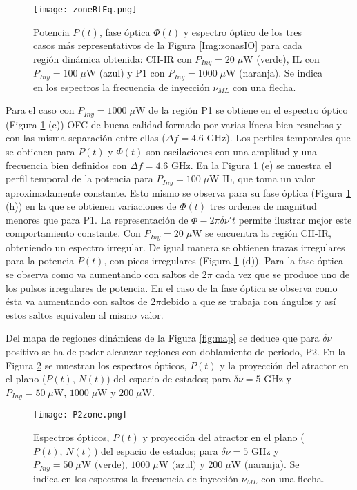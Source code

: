 			\begin{figure}[H]
				\centering
				\texttt{[image: zoneRtEq.png]}
				\caption{\label{fig:zoneRtEq}Potencia $P(t)$, fase óptica $\Phi (t)$ y espectro óptico de los tres casos más representativos de la Figura \ref{Img:zonasIO} para cada región dinámica obtenida: CH-IR con $P_{Iny} = 20\;\mu$W (verde), IL con $P_{Iny} = 100\;\mu$W (azul) y P1 con $P_{Iny} = 1000\;\mu$W (naranja). Se indica en los espectros la frecuencia de inyección $\nu_{ML}$ con una flecha.}	
			\end{figure}

		Para el caso con $P_{Iny} = 1000\;\mu$W de la región P1 se obtiene en el espectro óptico (Figura \ref{fig:zoneRtEq} (c)) OFC de buena calidad formado por varias líneas bien resueltas y con las misma separación entre ellas ($\Delta f = 4.6$ GHz). Los perfiles temporales que se obtienen para $P(t)$ y $\Phi(t)$ son oscilaciones con una amplitud y una frecuencia bien definidos con $\Delta f = 4.6$ GHz. En la Figura \ref{fig:zoneRtEq} (e)  se muestra el perfil temporal de la potencia para $P_{Iny} = 100\;\mu$W IL, que toma un valor aproximadamente constante. Esto mismo se observa para su fase óptica (Figura \ref{fig:zoneRtEq} (h)) en la que se obtienen variaciones de $\Phi(t)$ tres ordenes de magnitud menores que para P1. La representación de $\Phi - 2\pi\delta\nu't$ permite ilustrar mejor este comportamiento constante. Con $P_{Iny} = 20\;\mu$W se encuentra la región CH-IR, obteniendo un espectro irregular. De igual manera se obtienen trazas irregulares para la potencia $P(t)$, con picos irregulares (Figura \ref{fig:zoneRtEq} (d)). Para la fase óptica se observa como va aumentando con saltos de $2\pi$ cada vez que se produce uno de los pulsos irregulares de potencia. En el caso de la fase \'optica se observa como \'esta va aumentando con saltos de $2 \pi$debido a que se trabaja con \'angulos y as\'i estos saltos equivalen al mismo valor. 

		Del mapa de regiones dinámicas de la Figura \ref{fig:map} se deduce que para $\delta\nu$ positivo se ha de poder alcanzar regiones con doblamiento de periodo, P2. En la Figura \ref{fig:P2zone} se muestran los espectros ópticos, $P(t)$ y la proyecci\'on del atractor en el plano ($P(t)$, $N(t)$) del espacio de estados; para $\delta\nu = 5$ GHz y $P_{Iny} = 50\;\mu \textrm{W, } 1000\;\mu\textrm{W y } 200\;\mu$W.

			\begin{figure}[H]
				\centering
				\texttt{[image: P2zone.png]}
				\caption{\label{fig:P2zone}Espectros ópticos, $P(t)$ y proyecci\'on del atractor en el plano ($P(t)$, $N(t)$) del espacio de estados; para $\delta\nu = 5$ GHz y $P_{Iny} = 50\;\mu \textrm{W (verde), } 1000\;\mu\textrm{W (azul) y } 200\;\mu$W (naranja). Se indica en los espectros la frecuencia de inyección $\nu_{ML}$ con una flecha.}	
			\end{figure}

